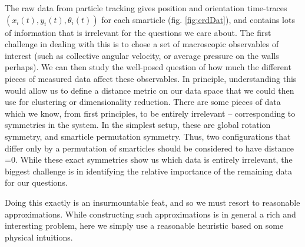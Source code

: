 \documentclass[11pt]{article}
\renewcommand{\=}[1]{\stackrel{#1}{=}} %
\renewcommand{\(}{\left (}
\renewcommand{\)}{\right  )}
\renewcommand{\[}{\left [}
\renewcommand{\]}{\right ]}
\newcommand{\<}{\left <}
\renewcommand{\>}{\right >}
\theoremstyle{definition}
\theoremstyle{remark}
\begin{document}
The raw data from particle tracking gives position and orientation time-traces $ (x_i(t), y_i(t), \theta_i(t)) $ for each smarticle (fig. \ref{fig:crdDat}), and contains lots of information that is irrelevant for the questions we care about. The first challenge in dealing with this is to chose a set of macroscopic observables of interest (such as collective angular velocity, or average pressure on the walls perhaps). We can then study the well-posed question of how much the different pieces of measured data affect these observables. In principle, understanding this would allow us to define a distance metric on our data space that we could then use for clustering or dimensionality reduction. There are some pieces of data which we know, from first principles, to be entirely irrelevant -- corresponding to symmetries in the system. In the simplest setup, these are global rotation symmetry, and smarticle permutation symmetry. Thus, two configurations that differ only by a permutation of smarticles should be considered to have distance =0. While these exact symmetries show us which data is entirely irrelevant, the biggest challenge is in identifying the relative importance of the remaining data for our questions. 

Doing this exactly is an insurmountable feat, and so we must resort to reasonable approximations. While constructing such approximations is in general a rich and interesting problem, here we simply use a reasonable heuristic based on some physical intuitions. 
\end{document}
